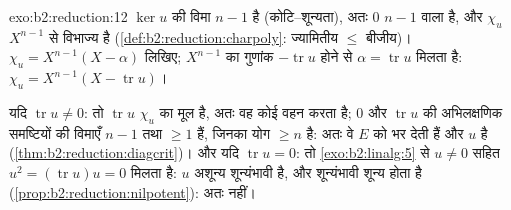 \begin{solution}{exo:b2:reduction:12}
$\ker u$ की विमा $n - 1$ है (कोटि--शून्यता), अतः $0$  $n - 1$ वाला
 है, और $\chi_u$ $X^{n-1}$ से विभाज्य है (\cref{def:b2:reduction:charpoly}: ज्यामितीय $\leq$
बीजीय)। $\chi_u = X^{n-1}(X - \alpha)$ लिखिए; $X^{n-1}$ का गुणांक $-\operatorname{tr} u$ होने से $\alpha =
\operatorname{tr} u$ मिलता है: $\chi_u = X^{n-1}(X - \operatorname{tr}
u)$।

यदि $\operatorname{tr} u \neq 0$: तो  $\operatorname{tr} u$ $\chi_u$ का मूल है, अतः वह कोई  वहन करता है; $0$ और $\operatorname{tr} u$ की अभिलक्षणिक समष्टियों की विमाएँ $n - 1$
तथा $\geq 1$ हैं, जिनका योग $\geq n$ है: अतः वे $E$ को भर देती हैं और $u$
 है (\cref{thm:b2:reduction:diagcrit})। और यदि $\operatorname{tr} u = 0$: तो \cref{exo:b2:linalg:5} से $u \neq 0$ सहित $u^2 = (\operatorname{tr} u)u = 0$ मिलता है:
$u$ अशून्य शून्यंभावी है, और  शून्यंभावी शून्य होता है
(\cref{prop:b2:reduction:nilpotent}): अतः  नहीं।
\end{solution}

